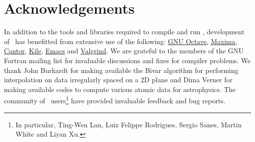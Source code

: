 \chapter{Acknowledgements}

In addition to the tools and libraries required to compile and run \glc, development of \glc\ has benefitted from extensive use of the following: \href{http://www.gnu.org/software/octave/}{{\sc GNU Octave}}, \href{http://maxima.sourceforge.net/}{{\sc Maxima}}, \href{http://edu.kde.org/cantor/}{{\sc Cantor}}, \href{http://kile.sourceforge.net/}{{\sc Kile}}, \href{http://www.gnu.org/software/emacs/}{{\sc Emacs}} and \href{http://valgrind.org/}{{\sc Valgrind}}. We are grateful to the members of the {\sc GNU Fortran} mailing list for invaluable discussions and fixes for compiler problems. We thank John Burkardt for making available the {\sc Bivar} algorithm for performing interpolation on data irregularly spaced on a 2D plane and Dima Verner for making available codes to compute various atomic data for astrophysics. The community of \glc\ users\footnote{In particular, Ting-Wen Lan, Luiz Felippe Rodrigues, Sergio Sanes, Martin White and Liyan Xu.} have provided invaluable feedback and bug reports.
